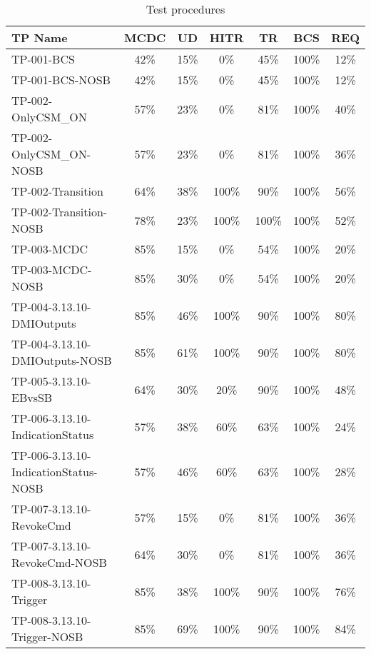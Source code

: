 \begin{table}[htbp]
\centering
\caption{\label{table:tp} Test procedures}
\bgroup
\def\arraystretch{1.5}%
\begin{tabular}{|l|c|c|c|c|c|c|}\hline\hline
TP Name & MCDC & UD & HITR & TR & BCS & REQ \\\hline
TP-001-BCS & 42\% & 15\% & 0\% & 45\% & 100\% & 12\% \\\hline
TP-001-BCS-NOSB & 42\% & 15\% & 0\% & 45\% & 100\% & 12\% \\\hline
TP-002-OnlyCSM\_ON & 57\% & 23\% & 0\% & 81\% & 100\% & 40\% \\\hline
TP-002-OnlyCSM\_ON-NOSB & 57\% & 23\% & 0\% & 81\% & 100\% & 36\% \\\hline
TP-002-Transition & 64\% & 38\% & 100\% & 90\% & 100\% & 56\% \\\hline
TP-002-Transition-NOSB & 78\% & 23\% & 100\% & 100\% & 100\% & 52\% \\\hline
TP-003-MCDC & 85\% & 15\% & 0\% & 54\% & 100\% & 20\% \\\hline
TP-003-MCDC-NOSB & 85\% & 30\% & 0\% & 54\% & 100\% & 20\% \\\hline
TP-004-3.13.10-DMIOutputs & 85\% & 46\% & 100\% & 90\% & 100\% & 80\% \\\hline
TP-004-3.13.10-DMIOutputs-NOSB & 85\% & 61\% & 100\% & 90\% & 100\% & 80\% \\\hline
TP-005-3.13.10-EBvsSB & 64\% & 30\% & 20\% & 90\% & 100\% & 48\% \\\hline
TP-006-3.13.10-IndicationStatus & 57\% & 38\% & 60\% & 63\% & 100\% & 24\% \\\hline
TP-006-3.13.10-IndicationStatus-NOSB & 57\% & 46\% & 60\% & 63\% & 100\% & 28\% \\\hline
TP-007-3.13.10-RevokeCmd & 57\% & 15\% & 0\% & 81\% & 100\% & 36\% \\\hline
TP-007-3.13.10-RevokeCmd-NOSB & 64\% & 30\% & 0\% & 81\% & 100\% & 36\% \\\hline
TP-008-3.13.10-Trigger & 85\% & 38\% & 100\% & 90\% & 100\% & 76\% \\\hline
TP-008-3.13.10-Trigger-NOSB & 85\% & 69\% & 100\% & 90\% & 100\% & 84\% \\\hline
\hline
\end{tabular}


\end{table}
